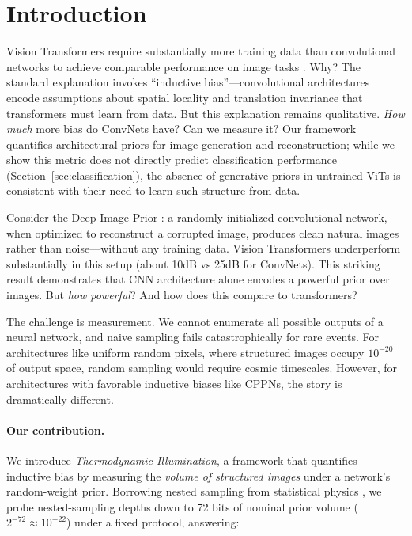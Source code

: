\documentclass{article}
\begin{document}
\section{Introduction}


Vision Transformers require substantially more training data than convolutional networks to achieve comparable performance on image tasks \cite{steiner2022how}. Why? The standard explanation invokes ``inductive bias''---convolutional architectures encode assumptions about spatial locality and translation invariance that transformers must learn from data. But this explanation remains qualitative. \emph{How much} more bias do ConvNets have? Can we measure it? Our framework quantifies architectural priors for image generation and reconstruction; while we show this metric does not directly predict classification performance (Section~\ref{sec:classification}), the absence of generative priors in untrained ViTs is consistent with their need to learn such structure from data.

Consider the Deep Image Prior \cite{ulyanov2018deep}: a randomly-initialized convolutional network, when optimized to reconstruct a corrupted image, produces clean natural images rather than noise---without any training data. Vision Transformers underperform substantially in this setup (about 10dB vs 25dB for ConvNets). This striking result demonstrates that CNN architecture alone encodes a powerful prior over images. But \emph{how powerful}? And how does this compare to transformers?

The challenge is measurement. We cannot enumerate all possible outputs of a neural network, and naive sampling fails catastrophically for rare events. For architectures like uniform random pixels, where structured images occupy $10^{-20}$ of output space, random sampling would require cosmic timescales. However, for architectures with favorable inductive biases like CPPNs, the story is dramatically different.

\paragraph{Our contribution.} We introduce \emph{Thermodynamic Illumination}, a framework that quantifies inductive bias by measuring the \emph{volume of structured images} under a network's random-weight prior. Borrowing nested sampling from statistical physics \cite{skilling2006nested}, we probe nested-sampling depths down to 72 bits of nominal prior volume ($2^{-72}\!\approx\!10^{-22}$) under a fixed protocol, answering:
\end{document}
